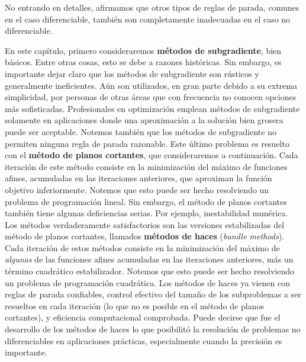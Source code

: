 No entrando en detalles, afirmamos que otros tipos de reglas de parada, comunes en el caso diferenciable, también son completamente inadecuadas en el caso no diferenciable.

En este capítulo, primero consideraremos \textbf{métodos de subgradiente}, bien básicos. Entre otras cosas, esto se debe a razones históricas. Sin embargo, es importante dejar claro que los métodos de subgradiente son rústicos y generalmente ineficientes. Aún son utilizados, en gran parte debido a su extrema simplicidad, por personas de otras áreas que con frecuencia no conocen opciones más sofisticadas. Profesionales en optimización emplean métodos de subgradiente solamente en aplicaciones donde una aproximación a la solución bien grosera puede ser aceptable. Notemos también que los métodos de subgradiente no permiten ninguna regla de parada razonable. Este último problema es resuelto con el \textbf{método de planos cortantes}, que consideraremos a continuación. Cada iteración de este método consiste en la minimización del máximo de funciones afines, acumuladas en las iteraciones anteriores, que aproximan la función objetivo inferiormente. Notemos que esto puede ser hecho resolviendo un problema de programación lineal. Sin embargo, el método de planos cortantes también tiene algunas deficiencias serias. Por ejemplo, inestabilidad numérica. Los métodos verdaderamente satisfactorios son las versiones estabilizadas del método de planos cortantes, llamados \textbf{métodos de haces} (\textit{bundle methods}). Cada iteración de estos métodos consiste en la minimización del máximo de \textit{algunas} de las funciones afines acumuladas en las iteraciones anteriores, más un término cuadrático estabilizador. Notemos que esto puede ser hecho resolviendo un problema de programación cuadrática. Los métodos de haces ya vienen con reglas de parada confiables, control efectivo del tamaño de los subproblemas a ser resueltos en cada iteración (lo que no es posible en el método de planos cortantes), y eficiencia computacional comprobada. Puede decirse que fue el desarrollo de los métodos de haces lo que posibilitó la resolución de problemas no diferenciables en aplicaciones prácticas, especialmente cuando la precisión es importante.